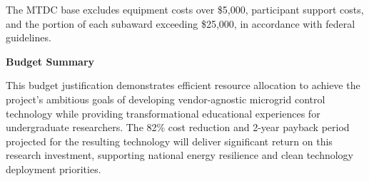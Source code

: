 \documentclass[12pt]{article}
\begin{document}
The MTDC base excludes equipment costs over \$5,000, participant support costs, and the portion of each subaward exceeding \$25,000, in accordance with federal guidelines.

\vspace{0.5cm}

\textbf{Budget Summary}

This budget justification demonstrates efficient resource allocation to achieve the project's ambitious goals of developing vendor-agnostic microgrid control technology while providing transformational educational experiences for undergraduate researchers. The 82\% cost reduction and 2-year payback period projected for the resulting technology will deliver significant return on this research investment, supporting national energy resilience and clean technology deployment priorities.
\end{document}
